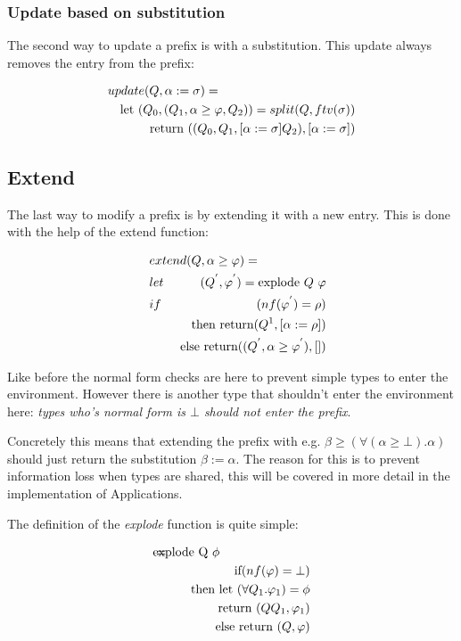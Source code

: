 \subsubsection{Update based on substitution}
The second way to update a prefix is with a substitution. This update always removes the entry from the prefix:

\begin{eqnarray*}
\lefteqn{update(Q, \alpha := \sigma) =} \\
 & & \textrm{let } (Q_0, (Q_1, \alpha \geq \varphi, Q_2)) = split(Q, ftv(\sigma)) \\
 & & \textrm{return } ((Q_0, Q_1, \lbrack \alpha := \sigma \rbrack Q_2), \lbrack \alpha := \sigma \rbrack)
\end{eqnarray*}
\subsection{Extend}
The last way to modify a prefix is by extending it with a new entry. This is done with the help of the extend function:

\begin{eqnarray*}
\lefteqn{extend(Q,\alpha \geq \varphi) = } \\
\hspace{10pt} &let& (Q^{'}, \varphi^{'}) = \textrm{explode } Q \textrm{ } \varphi \\
              &if&  (nf(\varphi^{'}) = \rho) \\
              & & \textrm{     then return} (Q^{1}, \lbrack \alpha := \rho \rbrack) \\
              & & \textrm{     else return} ((Q^{'}, \alpha \geq \varphi^{'}),\lbrack \rbrack)
\end{eqnarray*}

Like before the normal form checks are here to prevent simple types to enter the environment. However there is another type that shouldn't enter the environment here: \emph{types who's normal form is $\bot$ should not enter the prefix}. 

Concretely this means that extending the prefix with e.g. $\beta \geq (\forall(\alpha \geq \bot).\alpha)$ should just return the substitution $\beta := \alpha$. The reason for this is to prevent information loss when types are shared, this will be covered in more detail in the implementation of Applications.

The definition of the \emph{explode} function is quite simple:

\begin{eqnarray*}
\lefteqn{\textrm{explode Q $\phi$}} = \\
& & \textrm{if} (nf(\varphi) = \bot) \\
& & \quad \textrm{then let } (\forall Q_1 . \varphi_1) = \phi \\
& & \quad \textrm{     return } (Q Q_1, \varphi_1) \\
& & \quad \textrm{else return } (Q, \varphi)
\end{eqnarray*}


